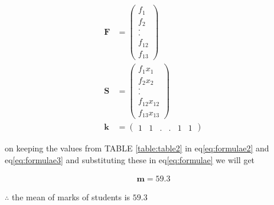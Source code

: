 \documentclass[journal,12pt,twocolumn]{IEEEtran}
\let\vec\mathbf
\newcommand{\myvec}[1]{\ensuremath{\begin{pmatrix}#1\end{pmatrix}}}
\begin{document}
     \begin{align}
    	 \label{eq:formulae2}
	      	\vec{F}&=\myvec{f_{1}\\f_{2}\\.\\.\\f_{12}\\f_{13}}     \\
	     \label{eq:formulae3}
	      	\vec{S}&=\myvec{f_{1}x_{1}\\f_{2}x_{2}\\.\\.\\f_{12}x_{12}\\f_{13}x_{13}}    \\
	     \label{eq:formulae4}
      		\vec{k}&=\myvec{1 & 1 & . & . & 1 & 1}
    \end{align}
    
    on keeping the values from TABLE \ref{table:table2} in eq\eqref{eq:formulae2} and eq\eqref{eq:formulae3} and substituting these in eq\eqref{eq:formulae} we will get

     \begin{align}
         \vec{m} = 59.3
     \end{align}
 
    
    $\therefore$ the mean of marks of students is $59.3$
    
\end{document}

